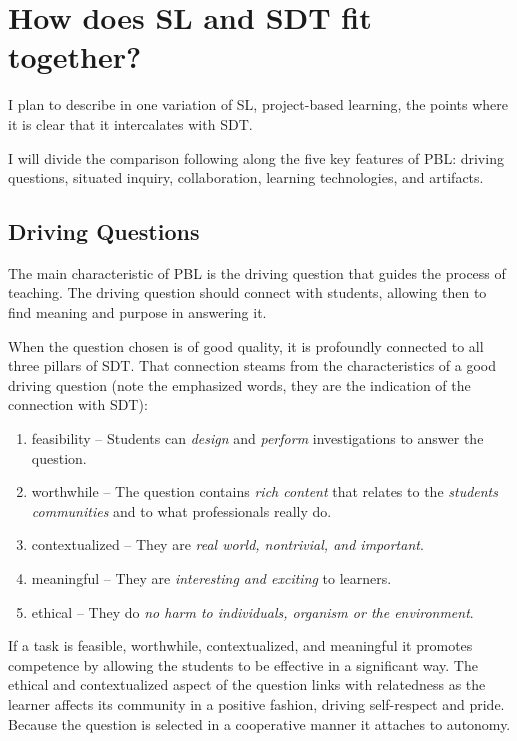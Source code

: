 \section{How does SL and SDT fit together?}

I plan to describe in one variation of SL, project-based learning, 
the points where it is clear that it intercalates with SDT. 

I will divide the comparison following along the five key features of PBL:
driving questions, situated inquiry, collaboration, learning technologies, and
artifacts.\cite{education:joseph_phyllis__pbl}

\subsection{Driving Questions}

The main characteristic of PBL is the driving question that guides the process
of teaching. The driving question should connect with students, allowing then to
find meaning and purpose in answering it.

When the question chosen is of good quality, it is profoundly connected to
all three pillars of SDT. That connection steams from the characteristics of a
good driving question (note the emphasized words, they are the indication of the
connection with SDT):\cite{education:joseph_phyllis__pbl}

\begin{enumerate}
\item feasibility -- Students can \emph{design} and \emph{perform}
investigations to answer the question.

\item worthwhile -- The question contains \emph{rich content} that relates to
the \emph{students communities} and to what professionals really do.

\item contextualized -- They are \emph{real world, nontrivial, and important}.

\item meaningful -- They are \emph{interesting and exciting} to learners.

\item ethical -- They do \emph{no harm to individuals, organism or the
environment}.
\end{enumerate}

If a task is feasible, worthwhile, contextualized, and meaningful it promotes
competence by allowing the students to be effective in a significant way. The
ethical and contextualized aspect of the question links with relatedness as the
learner affects its community in a positive fashion, driving self-respect and
pride.  Because the question is selected in a cooperative manner
\cite{education:joseph_phyllis__pbl} it attaches to autonomy.

